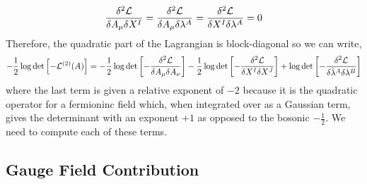 \documentclass[12pt]{article}
\begin{document}
\[ \frac{\delta^2 \mathcal{L}}{\delta A_\mu \delta X^I} = \frac{\delta^2 \mathcal{L}}{\delta A_\mu \delta \lambda^A} = \frac{\delta^2 \mathcal{L}}{\delta X^I \delta \lambda^A} = 0 \]
Therefore, the quadratic part of the Lagrangian is block-diagonal so we can write,
\[ -\frac{1}{2} \log{\det{\left[ - \mathcal{L}^{(2)}(A) \right]}} = - \frac{1}{2} \log{\det{\left[ - \frac{\delta^2 \mathcal{L}}{\delta A_\mu \delta A_\nu} \right]}} - \frac{1}{2} \log{\det{\left[ - \frac{\delta^2 \mathcal{L}}{\delta X^I \delta X^J} \right]} } + \log{\det{\left[ - \frac{\delta^2 \mathcal{L}}{\delta \bar{\lambda}^A \delta \lambda^B} \right]} }
\]
where the last term is given a relative exponent of $-2$ because it is the quadratic operator for  a fermioninc field which, when integrated over as a Gaussian term, gives the determinant with an exponent $+1$ as opposed to the bosonic $-\frac{1}{2}$. We need to compute each of these terms. 

\subsection{Gauge Field Contribution}
\end{document}
